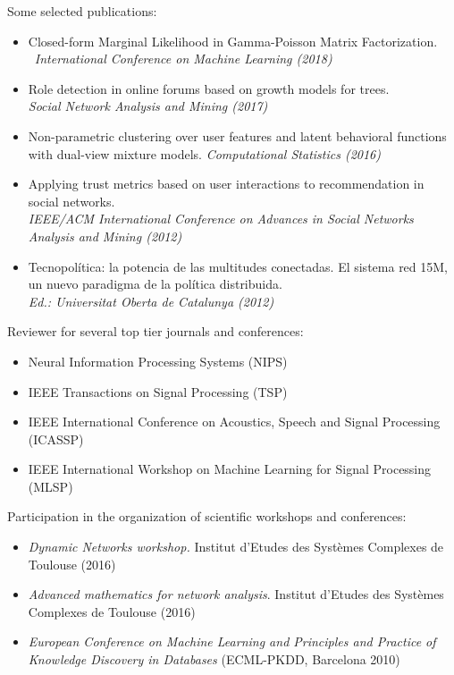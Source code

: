\documentclass[paper=a4,fontsize=11pt]{temp} %
\begin{document}
\noindent{}


Some selected publications:
\begin{itemize}[leftmargin=*]
\item Closed-form Marginal Likelihood in Gamma-Poisson Matrix Factorization. \\\ \textit{International Conference on Machine Learning (2018)}
\item Role detection in online forums based on growth models for trees. \\\textit{Social Network Analysis and Mining (2017)}
\item Non-parametric clustering over user features and latent behavioral functions with dual-view mixture models. \textit{Computational Statistics (2016)}
\item Applying trust metrics based on user interactions to recommendation in social networks. \\\textit{IEEE/ACM International Conference on Advances in Social Networks Analysis and Mining (2012)} 
\item Tecnopolítica: la potencia de las multitudes conectadas. El sistema red 15M, un nuevo paradigma de la política distribuida. \\\textit{Ed.: Universitat Oberta de Catalunya (2012)}
\end{itemize}
\vspace{-0.25cm}             

Reviewer for several top tier journals and conferences:
\begin{itemize}[leftmargin=*]
\setlength\itemsep{0.0em}
\item Neural Information Processing Systems (NIPS)
\item IEEE Transactions on Signal Processing (TSP)
\item IEEE International Conference on Acoustics, Speech and Signal Processing (ICASSP)
\item  IEEE International Workshop on Machine Learning for Signal Processing (MLSP)
\end{itemize}
Participation in the organization of scientific workshops and conferences:
\begin{itemize}[leftmargin=*]
\setlength\itemsep{0.0em}
\item \textit{Dynamic Networks workshop.} Institut d'Etudes des Systèmes Complexes de Toulouse (2016)
\item \textit{Advanced mathematics for network analysis}. Institut d'Etudes des Systèmes Complexes de Toulouse (2016)
\item \textit{European Conference on Machine Learning and Principles and Practice of Knowledge Discovery in Databases} (ECML-PKDD, Barcelona 2010)
\end{itemize}
\vspace{-0.25cm}             
\end{document}
